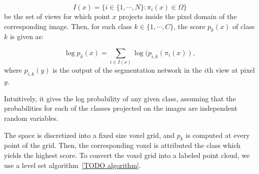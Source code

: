 $$
I(x) = \{ i \in
\{1,\cdots, N \} : \pi_i(x) \in \Omega \}
$$
be the set of views for which point
$x$ projects inside the pixel domain of the corresponding image. Then, for each
class $k \in \{ 1,\cdots, C \}$, the score $p_k(x)$ of class $k$ is given as:

$$
\log p_k(x) = \sum_{i\in I(x)} \log ( p_{i,k} (\pi_i(x) ),
$$
where $p_{i,k} (y)$ is the output of the segmentation network in the $i$th view
at pixel $y$.

Intuitively, it gives the log probability of any given class, assuming that the
probabilities for each of the classes projected on the images are independent
random variables.

The space is discretized into a fixed size voxel grid, and $p_k$ is computed at every
point of the grid. Then, the corresponding voxel is attributed the class which
yields the highest score. To convert the voxel grid into a labeled point cloud,
we use a level set algorithm~\ref{TODO algorithm}.

